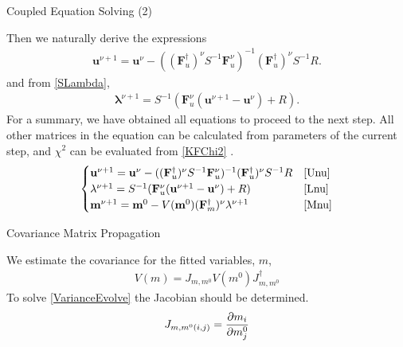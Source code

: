 \documentclass[
	xcolor=dvipsnames,
	aspectratio=169,	
	10pt, 
	]{beamer}
\begin{document}
\begin{frame}{Coupled Equation Solving (2)}
	\begin{block}{}
		Then we naturally derive the expressions
		\begin{align}
			\mathbf{u}^{\nu+1}=\mathbf{u}^\nu - ((\mathbf{F}_u^\dagger)^\nu S^{-1}\mathbf F^\nu_u)^{-1}(\mathbf{F}_u^\dagger)^\nu S^{-1}R\label{Unu}.
		\end{align} 
		and from \eqref{SLambda},
		\begin{align}
			\mathbf\lambda^{\nu+1} = S^{-1}(\mathbf F^\nu_u(\mathbf u^{\nu+1}-\mathbf u^\nu) + R)\label{Lnu}.
		\end{align}
		For a summary, we have obtained all equations to proceed to the next step. All other matrices in the equation can be calculated from parameters of the current step, and $\chi^2$ can be evaluated from \eqref{KFChi2} .
		\begin{align*}
			\begin{cases}
				\mathbf{u}^{\nu+1}=\mathbf{u}^\nu - ((\mathbf{F}_u^\dagger)^\nu S^{-1}\mathbf F^\nu_u)^{-1}(\mathbf{F}_u^\dagger)^\nu S^{-1}R&\eqref{Unu}\\
				\mathbf\lambda^{\nu+1} = S^{-1}(\mathbf F^\nu_u(\mathbf u^{\nu+1}-\mathbf u^\nu) + R)&\eqref{Lnu}\\
				\mathbf{m}^{\nu+1}=\mathbf{m}^0-V(\mathbf m^0)(\mathbf{F}_m^\dagger)^\nu\mathbf\lambda^{\nu+1}&\eqref{Mnu}
			\end{cases}
		\end{align*}
	\end{block}
\end{frame}
\begin{frame}{Covariance Matrix Propagation}
	\begin{block}{}
		We estimate the covariance for the fitted variables, $m$,
		\begin{align}
			V(m) = J_{m,m^0}V(m^0)J_{m,m^0}^\dagger\label{VarianceEvolve}
		\end{align}
		To solve \eqref{VarianceEvolve} the Jacobian should be determined.
		\begin{align}
			J_{m,m^0(i,j)} = \frac{\partial m_i}{\partial m^0_j}\label{Jacobian}
		\end{align}
	\end{block}
\end{frame}
\end{document}
